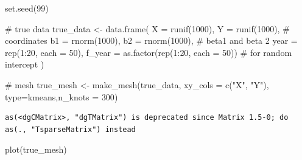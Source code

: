 \documentclass[
  letterpaper,
  DIV=11,
  numbers=noendperiod]{scrartcl}
\newenvironment{Shaded}{\begin{snugshade}}{\end{snugshade}}
\newcommand{\AttributeTok}[1]{\textcolor[rgb]{0.40,0.45,0.13}{#1}}
\newcommand{\CommentTok}[1]{\textcolor[rgb]{0.37,0.37,0.37}{#1}}
\newcommand{\DecValTok}[1]{\textcolor[rgb]{0.68,0.00,0.00}{#1}}
\newcommand{\FunctionTok}[1]{\textcolor[rgb]{0.28,0.35,0.67}{#1}}
\newcommand{\NormalTok}[1]{\textcolor[rgb]{0.00,0.23,0.31}{#1}}
\newcommand{\OtherTok}[1]{\textcolor[rgb]{0.00,0.23,0.31}{#1}}
\newcommand{\SpecialCharTok}[1]{\textcolor[rgb]{0.37,0.37,0.37}{#1}}
\newcommand{\StringTok}[1]{\textcolor[rgb]{0.13,0.47,0.30}{#1}}
\begin{document}
\begin{Shaded}
\begin{Highlighting}[]
\FunctionTok{set.seed}\NormalTok{(}\DecValTok{99}\NormalTok{)}

\CommentTok{\# true data}
\NormalTok{true\_data }\OtherTok{\textless{}{-}} \FunctionTok{data.frame}\NormalTok{(}
  \AttributeTok{X =} \FunctionTok{runif}\NormalTok{(}\DecValTok{1000}\NormalTok{), }\AttributeTok{Y =} \FunctionTok{runif}\NormalTok{(}\DecValTok{1000}\NormalTok{), }\CommentTok{\# coordinates}
  \AttributeTok{b1 =} \FunctionTok{rnorm}\NormalTok{(}\DecValTok{1000}\NormalTok{), }\AttributeTok{b2 =} \FunctionTok{rnorm}\NormalTok{(}\DecValTok{1000}\NormalTok{), }\CommentTok{\# beta1 and beta 2}
  \AttributeTok{year =} \FunctionTok{rep}\NormalTok{(}\DecValTok{1}\SpecialCharTok{:}\DecValTok{20}\NormalTok{, }\AttributeTok{each =} \DecValTok{50}\NormalTok{),}
  \AttributeTok{f\_year =} \FunctionTok{as.factor}\NormalTok{(}\FunctionTok{rep}\NormalTok{(}\DecValTok{1}\SpecialCharTok{:}\DecValTok{20}\NormalTok{, }\AttributeTok{each =} \DecValTok{50}\NormalTok{)) }\CommentTok{\# for random intercept}
\NormalTok{)}

\CommentTok{\# mesh}
\NormalTok{true\_mesh }\OtherTok{\textless{}{-}} \FunctionTok{make\_mesh}\NormalTok{(true\_data, }\AttributeTok{xy\_cols =} \FunctionTok{c}\NormalTok{(}\StringTok{"X"}\NormalTok{, }\StringTok{"Y"}\NormalTok{), }\AttributeTok{type=}\StringTok{\textquotesingle{}kmeans\textquotesingle{}}\NormalTok{,}\AttributeTok{n\_knots =} \DecValTok{300}\NormalTok{)}
\end{Highlighting}
\end{Shaded}

\begin{verbatim}
as(<dgCMatrix>, "dgTMatrix") is deprecated since Matrix 1.5-0; do as(., "TsparseMatrix") instead
\end{verbatim}

\begin{Shaded}
\begin{Highlighting}[]
\FunctionTok{plot}\NormalTok{(true\_mesh)}
\end{Highlighting}
\end{Shaded}
\end{document}
